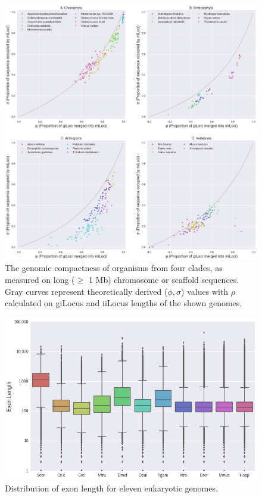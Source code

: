 \begin{figure}[h]
\includegraphics[scale=0.3]{Assets/Graphics/iLoci/compactness-by-clade.png}
\caption{The genomic compactness of organisms from four clades, as measured on long ($\geq$ 1 Mb) chromosome or scaffold sequences. Gray curves represent theoretically derived ($\phi, \sigma$) values with $\rho$ calculated on giLocus and iiLocus lengths of the shown genomes.}
\label{Fig:CompactnessByClade}
\end{figure}

\begin{figure}[h]
\includegraphics[scale=0.4]{Assets/Graphics/iLoci/modorg-exon-length.png}
\caption{Distribution of exon length for eleven eukaryotic genomes.}
\label{Fig:piLocusExonLength}
\end{figure}


